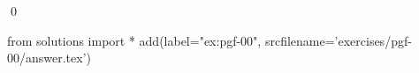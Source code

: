 
\begin{ex} 
  \label{ex:pgf-00}
  
  \qed
\end{ex} 
\begin{python0}
from solutions import *
add(label="ex:pgf-00",
    srcfilename='exercises/pgf-00/answer.tex') 
\end{python0}
